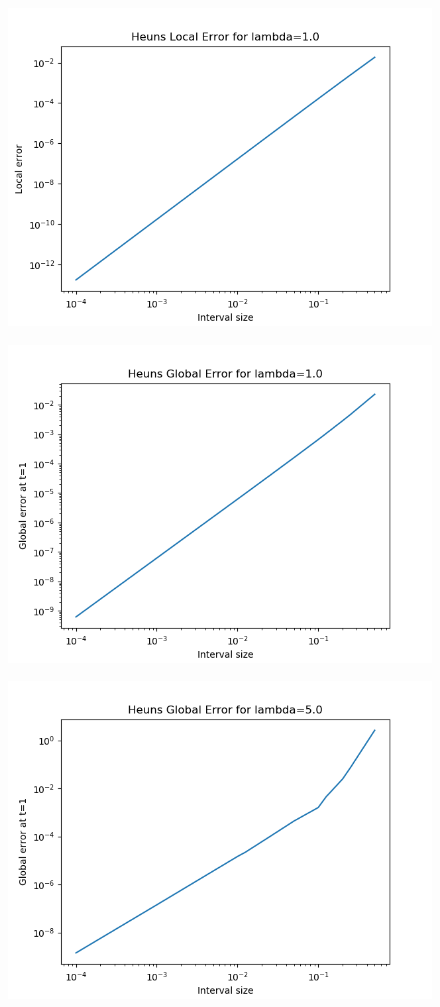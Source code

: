 \documentclass{article}
\begin{document}
\begin{itemize}
		\begin{figure}[H]
			\includegraphics[scale=0.6]{loglog1b1local}
		\end{figure}
		\begin{figure}[H]
			\includegraphics[scale=0.6]{loglog1b1global}
		\end{figure}
		\begin{figure}[H]
			\includegraphics[scale=0.6]{loglog1b5global}

\end{figure}
\end{itemize}
\end{document}
